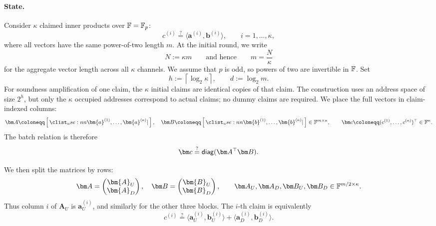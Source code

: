 \documentclass[runningheads]{llncs}
\begin{document}
\paragraph{State.}
Consider \(\kappa\) claimed inner products over
\({\mathbb{F}}=\mathbb F_p\):
\[
    c^{(i)}\stackrel{?}{=}\langle\bm a^{(i)},\bm b^{(i)}\rangle,
    \qquad i=1,\ldots,\kappa,
\]
where all vectors have the same power-of-two length \(m\).
At the initial round, we write
\[
    N:=\kappa m
    \qquad\text{and hence}\qquad
    m=\frac{N}{\kappa}
\]
for the aggregate vector length across all \(\kappa\) channels.
We assume that \(p\) is odd, so powers of two are invertible in
\({\mathbb{F}}\).
Set
\[
    h:=\left\lceil\log_2\kappa\right\rceil,
    \qquad
    d:=\log_2 m.
\]
For soundness amplification of one claim, the \(\kappa\) initial
claims are identical copies of that claim.
The construction uses an address space of size \(2^h\), but only
the \(\kappa\) occupied addresses correspond to actual claims; no dummy
claims are required.  We place the full vectors in claim-indexed
columns:
\[
    \bm A \coloneqq \concat{\bm{a}^{(1)}, \ldots, \bm{a}^{(\kappa)}},
    \quad
    \bm B \coloneqq \concat{\bm{b}^{(1)}, \ldots, \bm{b}^{(\kappa)}}
      \in\Field^{m \times \kappa},
    \qquad
    \bm c \coloneqq
      (c^{(1)}, \ldots, c^{(\kappa)})^\top
      \in\Field^\kappa.
\]
The batch relation is therefore
\begin{equation}
    \bm c
      \stackrel{?}{=}
      \diag(\bm A^\top\bm B).
\label{eq:packed-parent-matrix-relation}
\end{equation}

We then split the matrices by rows:
\[
    \bm A=
    \begin{pmatrix}
    \bm{A}_U\\
    \bm{A}_D
    \end{pmatrix}
    ,\quad
    \bm B=
    \begin{pmatrix}
    \bm{B}_U\\
    \bm{B}_D
    \end{pmatrix},
    \qquad
    \bm A_U,\bm A_D,\bm B_U,\bm B_D
      \in\Field^{m/2 \times \kappa}.
\]
Thus column \(i\) of \(\bm A_U\) is \(\bm a_U^{(i)}\), and similarly
for the other three blocks.  The \(i\)-th claim is equivalently
\begin{equation}
    c^{(i)}
      \stackrel{?}{=}
      \langle\bm a_{U}^{(i)},\bm b_{U}^{(i)}\rangle
      +
      \langle\bm a_{D}^{(i)} ,\bm b_{D}^{(i)}\rangle.
\label{eq:packed-parent-relation}
\end{equation}
\end{document}
